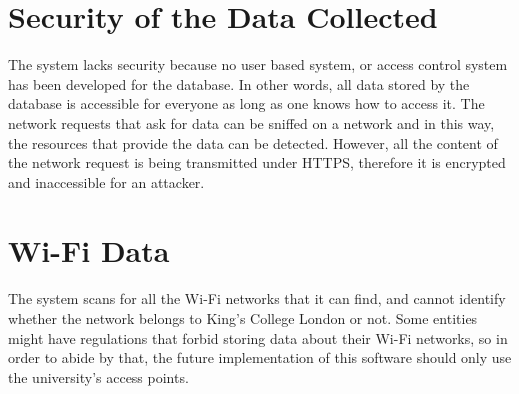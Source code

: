 \section{Security of the Data Collected}
The system lacks security because no user based system, or access control system has been developed for the database. In other words, all data stored by the database is accessible for everyone as long as one knows how to access it. The network requests that ask for data can be sniffed on a network and in this way, the resources that provide the data can be detected. However, all the content of the network request is being transmitted under HTTPS, therefore it is encrypted and inaccessible for an attacker.

\section{Wi-Fi Data}
The system scans for all the Wi-Fi networks that it can find, and cannot identify whether the network belongs to King's College London or not. Some entities might have regulations that forbid storing data about their Wi-Fi networks, so in order to abide by that, the future implementation of this software should only use the university's access points.